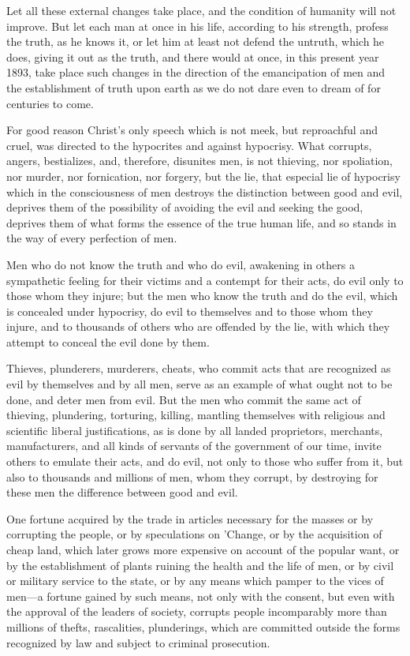 \documentclass{book}
\begin{document}
Let all these external changes take place, and the condition of humanity will not improve. But let each man at once in his life, according to his strength, profess the truth, as he knows it, or let him at least not defend the untruth, which he does, giving it out as the truth, and there would at once, in this present year 1893, take place such changes in the direction of the emancipation of men and the establishment of truth upon earth as we do not dare even to dream of for centuries to come.

For good reason Christ’s only speech which is not meek, but reproachful and cruel, was directed to the hypocrites and against hypocrisy. What corrupts, angers, bestializes, and, therefore, disunites men, is not thieving, nor spoliation, nor murder, nor fornication, nor forgery, but the lie, that especial lie of hypocrisy which in the consciousness of men destroys the distinction between good and evil, deprives them of the possibility of avoiding the evil and seeking the good, deprives them of what forms the essence of the true human life, and so stands in the way of every perfection of men.

Men who do not know the truth and who do evil, awakening in others a sympathetic feeling for their victims and a contempt for their acts, do evil only to those whom they injure; but the men who know the truth and do the evil, which is concealed under hypocrisy, do evil to themselves and to those whom they injure, and to thousands of others who are offended by the lie, with which they attempt to conceal the evil done by them.

Thieves, plunderers, murderers, cheats, who commit acts that are recognized as evil by themselves and by all men, serve as an example of what ought not to be done, and deter men from evil. But the men who commit the same act of thieving, plundering, torturing, killing, mantling themselves with religious and scientific liberal justifications, as is done by all landed proprietors, merchants, manufacturers, and all kinds of servants of the government of our time, invite others to emulate their acts, and do evil, not only to those who suffer from it, but also to thousands and millions of men, whom they corrupt, by destroying for these men the difference between good and evil.

One fortune acquired by the trade in articles necessary for the masses or by corrupting the people, or by speculations on ’Change, or by the acquisition of cheap land, which later grows more expensive on account of the popular want, or by the establishment of plants ruining the health and the life of men, or by civil or military service to the state, or by any means which pamper to the vices of men—a fortune gained by such means, not only with the consent, but even with the approval of the leaders of society, corrupts people incomparably more than millions of thefts, rascalities, plunderings, which are committed outside the forms recognized by law and subject to criminal prosecution.
\end{document}
